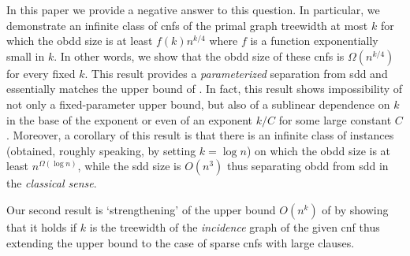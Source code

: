 \documentclass{article}
\begin{document}
In this paper we provide a negative answer to this question. In particular, we demonstrate an infinite class of
{\sc cnf}s of the primal graph treewidth at most $k$ for which the {\sc obdd} size is at least
$f(k)n^{k/4}$ where $f$ is a function exponentially small in $k$. In other words, we show
that the {\sc obdd} size of these {\sc cnf}s is $\Omega(n^{k/4})$ for every fixed $k$.
This result provides a \emph{parameterized} separation from {\sc sdd} and essentially matches the upper bound of \cite{VardiTWD}. 
In fact, this result shows impossibility of not only a fixed-parameter upper bound, but also 
of a sublinear dependence on $k$ in the base of the exponent or even of 
an exponent $k/C$ for some large constant $C$. Moreover, a corollary of this result is that there is
an infinite class of instances (obtained, roughly speaking, by setting $k=\log n$) on which the {\sc obdd} 
size is at least $n^{\Omega(\log n)}$, while the {\sc sdd} size is $O(n^3)$ thus separating {\sc obdd} 
from {\sc sdd} in the \emph{classical sense}.


Our second result is `strengthening' of the upper bound $O(n^{k})$ of \cite{VardiTWD} by showing that it
holds if $k$ is the treewidth of the \emph{incidence} graph of the given {\sc cnf} thus extending the 
upper bound to the case of sparse {\sc cnf}s with large clauses. 

\begin{comment}
Taking into account that $n^{\Omega(k)}$ lower bound presented in this paper applies when $k$ is 
the treewidth of the incidence
graph (the treewidth of the incidence graph is at most the treewidth of the primal graph plus one),
we conclude that, together with the upper bound of \cite{VardiTWD},
the results of this paper provide a \emph{complete classification} of the expressive power of {\sc obdd} for
{\sc cnf}s parameterized by the treewidth of their primal and incidence graphs. 
\end{comment}
\end{document}
